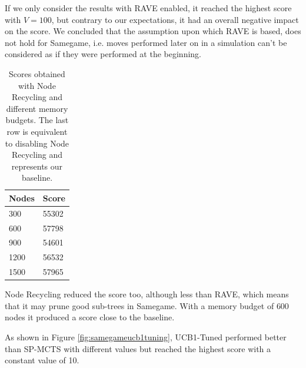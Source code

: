 \medskip\noindent
 If we only consider the results with RAVE enabled, it reached the highest score with $V=100$, but contrary to our expectations, it had an overall negative impact on the score. We concluded that the assumption upon which RAVE is based, does not hold for Samegame, i.e. moves performed later on in a simulation can't be considered as if they were performed at the beginning.

\begin{table}[!h]
    \centering
    \begin{tabular}{l|l}
        Nodes & Score \\
        \hline 
        300 & 55302 \\
        600 & 57798 \\
        900 & 54601 \\
        1200 & 56532 \\
        1500 & 57965 \\
    \end{tabular}
    \caption[Node Recycling memory budgets scores]{Scores obtained with Node Recycling and different memory budgets. The last row is equivalent to disabling Node Recycling and represents our baseline.}
    \label{tab:tuningrecycling}
\end{table}

\medskip\noindent
Node Recycling reduced the score too, although less than RAVE, which means that it may prune good sub-trees in Samegame. With a memory budget of $600$ nodes it produced a score close to the baseline.



\medskip\noindent
As shown in Figure \ref{fig:samegameucb1tuning}, UCB1-Tuned performed better than SP-MCTS with different values but reached the highest score with a constant value of 10.

